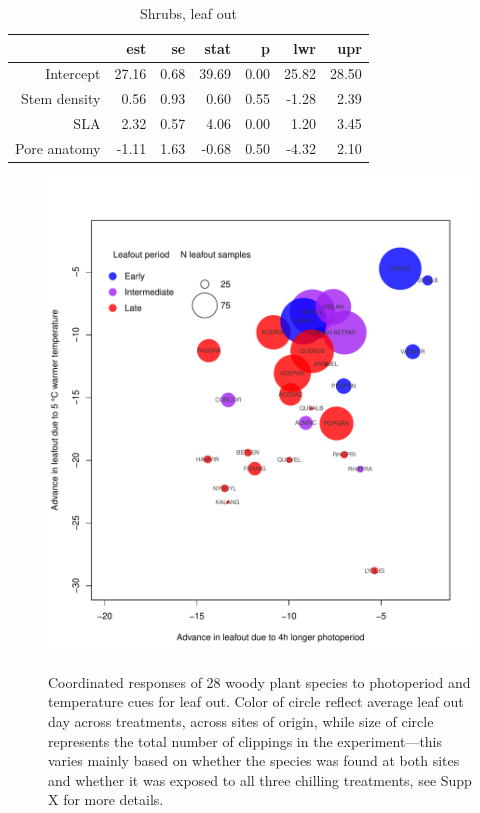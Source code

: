 \documentclass[11pt]{article}
\begin{document}
\begin{table}[ht]
\centering
\caption{Shrubs, leaf out} 
\begin{tabular}{rrrrrrr}
  \hline
 & est & se & stat & p & lwr & upr \\ 
  \hline
Intercept & 27.16 & 0.68 & 39.69 & 0.00 & 25.82 & 28.50 \\ 
  Stem density & 0.56 & 0.93 & 0.60 & 0.55 & -1.28 & 2.39 \\ 
  SLA & 2.32 & 0.57 & 4.06 & 0.00 & 1.20 & 3.45 \\ 
  Pore anatomy & -1.11 & 1.63 & -0.68 & 0.50 & -4.32 & 2.10 \\ 
   \hline
\end{tabular}
\end{table}

\begin{figure} %
\begin{center}
\caption{Coordinated responses of 28 woody plant species to photoperiod and temperature cues for leaf out. Color of circle reflect average leaf out day across treatments, across sites of origin, while size of circle represents the total number of clippings in the experiment---this varies mainly based on whether the species was found at both sites and whether it was exposed to all three chilling treatments, see Supp X for more details.} %
\includegraphics[scale=0.5]{Advplot2}
\label{fig1}
\end{center}
\end{figure}
\end{document}
